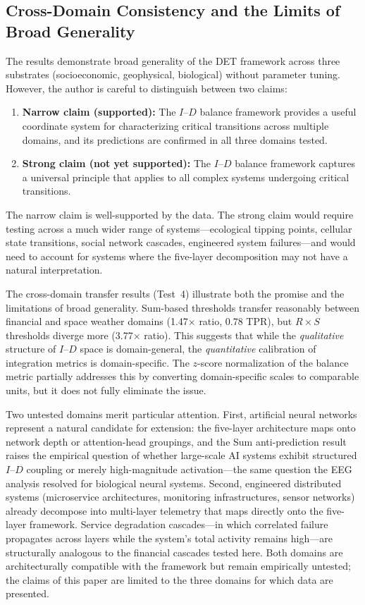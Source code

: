 \documentclass[aip,cha,reprint,amsmath,amssymb,final,floatfix]{revtex4-2}
\begin{document}
\subsection{Cross-Domain Consistency and the Limits of Broad Generality}

The results demonstrate broad generality of the DET framework across three substrates (socioeconomic, geophysical, biological) without parameter tuning. However, the author is careful to distinguish between two claims:

\begin{enumerate}
\item \textbf{Narrow claim (supported):} The $I$--$D$ balance framework provides a useful coordinate system for characterizing critical transitions across multiple domains, and its predictions are confirmed in all three domains tested.
\item \textbf{Strong claim (not yet supported):} The $I$--$D$ balance framework captures a universal principle that applies to all complex systems undergoing critical transitions.
\end{enumerate}

The narrow claim is well-supported by the data. The strong claim would require testing across a much wider range of systems---ecological tipping points, cellular state transitions, social network cascades, engineered system failures---and would need to account for systems where the five-layer decomposition may not have a natural interpretation.

The cross-domain transfer results (Test~4) illustrate both the promise and the limitations of broad generality. Sum-based thresholds transfer reasonably between financial and space weather domains (1.47$\times$ ratio, 0.78 TPR), but $R \times S$ thresholds diverge more (3.77$\times$ ratio). This suggests that while the \emph{qualitative} structure of $I$--$D$ space is domain-general, the \emph{quantitative} calibration of integration metrics is domain-specific. The $z$-score normalization of the balance metric partially addresses this by converting domain-specific scales to comparable units, but it does not fully eliminate the issue.

Two untested domains merit particular attention. First, artificial neural networks represent a natural candidate for extension: the five-layer architecture maps onto network depth or attention-head groupings, and the Sum anti-prediction result raises the empirical question of whether large-scale AI systems exhibit structured $I$--$D$ coupling or merely high-magnitude activation---the same question the EEG analysis resolved for biological neural systems. Second, engineered distributed systems (microservice architectures, monitoring infrastructures, sensor networks) already decompose into multi-layer telemetry that maps directly onto the five-layer framework. Service degradation cascades---in which correlated failure propagates across layers while the system's total activity remains high---are structurally analogous to the financial cascades tested here. Both domains are architecturally compatible with the framework but remain empirically untested; the claims of this paper are limited to the three domains for which data are presented.
\end{document}

